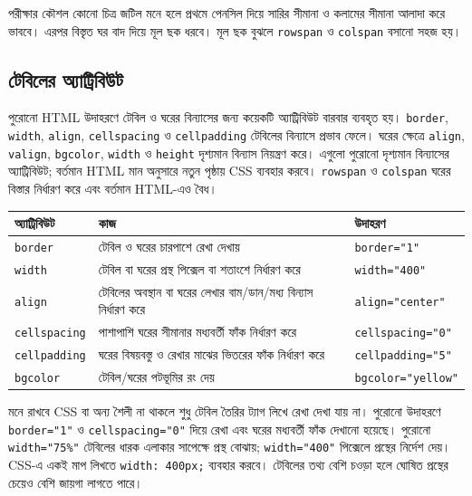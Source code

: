 \begin{keypointbox}{পরীক্ষার কৌশল}
কোনো চিত্র জটিল মনে হলে প্রথমে পেনসিল দিয়ে সারির সীমানা ও কলামের সীমানা আলাদা করে ভাববে। এরপর বিস্তৃত ঘর বাদ দিয়ে মূল ছক ধরবে। মূল ছক বুঝলে \texttt{rowspan} ও \texttt{colspan} বসানো সহজ হয়।
\end{keypointbox}

\subsection{টেবিলের অ্যাট্রিবিউট}

পুরোনো HTML উদাহরণে টেবিল ও ঘরের বিন্যাসের জন্য কয়েকটি অ্যাট্রিবিউট বারবার ব্যবহৃত হয়। \texttt{border}, \texttt{width}, \texttt{align}, \texttt{cellspacing} ও \texttt{cellpadding} টেবিলের বিন্যাসে প্রভাব ফেলে। ঘরের ক্ষেত্রে \texttt{align}, \texttt{valign}, \texttt{bgcolor}, \texttt{width} ও \texttt{height} দৃশ্যমান বিন্যাস নিয়ন্ত্রণ করে। এগুলো পুরোনো দৃশ্যমান বিন্যাসের অ্যাট্রিবিউট; বর্তমান HTML মান অনুসারে নতুন পৃষ্ঠায় CSS ব্যবহার করবে। \texttt{rowspan} ও \texttt{colspan} ঘরের বিস্তার নির্ধারণ করে এবং বর্তমান HTML-এও বৈধ।

\begin{center}
\begin{tabular}{|p{}|p{}|p{}|}
\hline
\textbf{অ্যাট্রিবিউট} & \textbf{কাজ} & \textbf{উদাহরণ} \\
\hline
\texttt{border} & টেবিল ও ঘরের চারপাশে রেখা দেখায় & \texttt{border="1"} \\
\hline
\texttt{width} & টেবিল বা ঘরের প্রস্থ পিক্সেল বা শতাংশে নির্ধারণ করে & \texttt{width="400"} \\
\hline
\texttt{align} & টেবিলের অবস্থান বা ঘরের লেখার বাম/ডান/মধ্য বিন্যাস নির্ধারণ করে & \texttt{align="center"} \\
\hline
\texttt{cellspacing} & পাশাপাশি ঘরের সীমানার মধ্যবর্তী ফাঁক নির্ধারণ করে & \texttt{cellspacing="0"} \\
\hline
\texttt{cellpadding} & ঘরের বিষয়বস্তু ও রেখার মাঝের ভিতরের ফাঁক নির্ধারণ করে & \texttt{cellpadding="5"} \\
\hline
\texttt{bgcolor} & টেবিল/ঘরের পটভূমির রং দেয় & \texttt{bgcolor="yellow"} \\
\hline
\end{tabular}
\end{center}

\begin{keypointbox}{মনে রাখবে}
CSS বা অন্য শৈলী না থাকলে শুধু টেবিল তৈরির ট্যাগ লিখে রেখা দেখা যায় না। পুরোনো উদাহরণে \texttt{border="1"} ও \texttt{cellspacing="0"} দিয়ে রেখা এবং ঘরের মধ্যবর্তী ফাঁক দেখানো হয়েছে। পুরোনো \texttt{width="75\%"} টেবিলের ধারক এলাকার সাপেক্ষে প্রস্থ বোঝায়; \texttt{width="400"} পিক্সেলে প্রস্থের নির্দেশ দেয়। CSS-এ একই মাপ লিখতে \texttt{width: 400px;} ব্যবহার করবে। টেবিলের তথ্য বেশি চওড়া হলে ঘোষিত প্রস্থের চেয়েও বেশি জায়গা লাগতে পারে।
\end{keypointbox}

